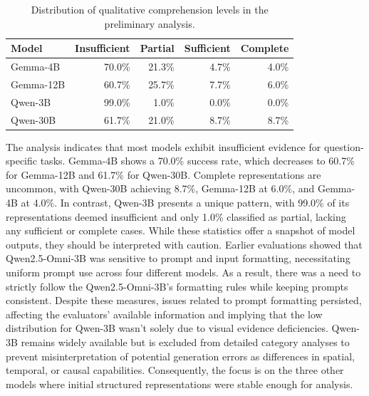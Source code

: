 \begin{table}[ht]
    \centering
    \small
    \begin{tabular}{lrrrr}
        \hline
        \textbf{Model} &
        \textbf{Insufficient} &
        \textbf{Partial} &
        \textbf{Sufficient} &
        \textbf{Complete} \\
        \hline

        Gemma-4B    &
        70.0\% &
        21.3\% &
        4.7\% &
        4.0\% \\

        Gemma-12B &
        60.7\% &
        25.7\% &
        7.7\% &
        6.0\% \\

        Qwen-3B  &
        99.0\% &
        1.0\% &
        0.0\% &
        0.0\% \\

        Qwen-30B &
        61.7\% &
        21.0\% &
        8.7\% &
        8.7\% \\

        \hline
    \end{tabular}

    \caption{Distribution of qualitative comprehension levels in the preliminary analysis.}
    \label{tab:preliminar_levels_global}
\end{table}
The analysis indicates that most models exhibit insufficient evidence for question-specific tasks. Gemma-4B    shows a 70.0\% success rate, which decreases to 60.7\% for Gemma-12B and 61.7\% for Qwen-30B. Complete representations are uncommon, with Qwen-30B achieving 8.7\%, Gemma-12B at 6.0\%, and Gemma-4B    at 4.0\%.
In contrast, Qwen-3B  presents a unique pattern, with 99.0\% of its representations deemed insufficient and only 1.0\% classified as partial, lacking any sufficient or complete cases. While these statistics offer a snapshot of model outputs, they should be interpreted with caution. Earlier evaluations showed that Qwen2.5-Omni-3B was sensitive to prompt and input formatting, necessitating uniform prompt use across four different models. As a result, there was a need to strictly follow the Qwen2.5-Omni-3B's formatting rules while keeping prompts consistent. Despite these measures, issues related to prompt formatting persisted, affecting the evaluators' available information and implying that the low distribution for Qwen-3B  wasn't solely due to visual evidence deficiencies.
Qwen-3B  remains widely available but is excluded from detailed category analyses to prevent misinterpretation of potential generation errors as differences in spatial, temporal, or causal capabilities. Consequently, the focus is on the three other models where initial structured representations were stable enough for analysis.
